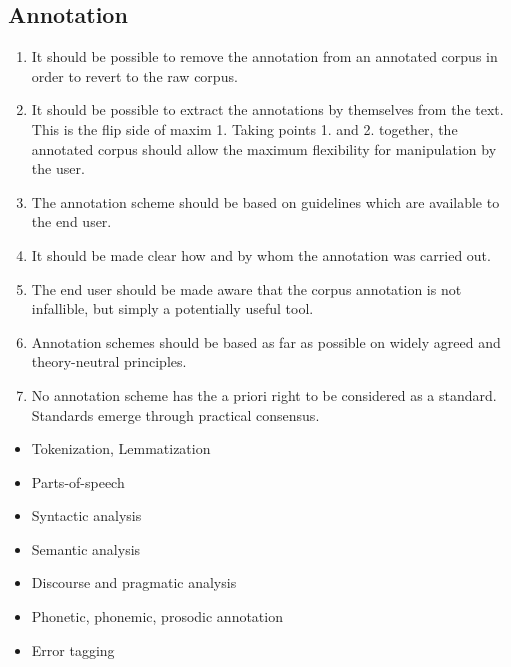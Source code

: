 \documentclass[a4paper,landscape,headrule,footrule,dvips]{foils}
\begin{document}
\begin{CJK}{UTF8}{min}
\section{Annotation}



\begin{enumerate}
\item It should be possible to remove the annotation
from an annotated corpus in order to revert to
the raw corpus.
\item It should be possible to extract the annotations
by themselves from the text. This is the flip side
of maxim 1. Taking points 1. and 2. together, the
annotated corpus should allow the maximum
flexibility for manipulation by the user.
\item The annotation scheme should be based on
guidelines which are available to the end user.
\item It should be made clear how and by whom the
annotation was carried out.
\item The end user should be made aware that the
corpus annotation is not infallible, but simply a
potentially useful tool.
\item Annotation schemes should be based as far as
possible on widely agreed and theory-neutral
principles.
\item No annotation scheme has the a priori right to
be considered as a standard. Standards emerge
through practical consensus.
\end{enumerate}

\begin{itemize}
\item  Tokenization, Lemmatization
\item  Parts-of-speech
\item  Syntactic analysis
\item  Semantic analysis
\item  Discourse and pragmatic analysis
\item  Phonetic, phonemic, prosodic annotation
\item  Error tagging
\end{itemize}


\end{CJK}
\end{document}
